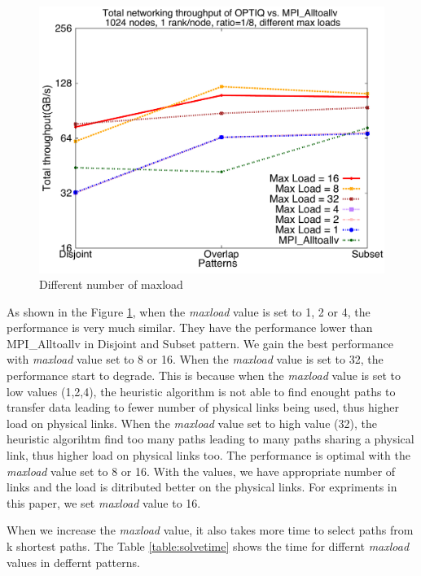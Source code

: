 \begin{figure}[!htb]
\vspace{-0.1in}
\centering
\includegraphics[scale=0.30]{figures/heu_paths_3p.pdf}
\vspace{-0.1in}
\caption{Different number of maxload}
\vspace{-0.1in}
\label{fig:heu_paths_3p}
\end{figure}

As shown in the Figure \ref{fig:heu_paths_3p}, when the \textit{maxload} value is set to 1, 2 or 4, the performance is very much similar. They have the performance lower than MPI\_Alltoallv in Disjoint and Subset pattern. We gain the best performance with \textit{maxload} value set to 8 or 16. When the \textit{maxload} value is set to 32, the performance start to degrade. This is because when the \textit{maxload} value is set to low values (1,2,4), the heuristic algorithm is not able to find enought paths to transfer data leading to fewer number of physical links being used, thus higher load on physical links. When the \textit{maxload} value set to high value (32), the heuristic algorihtm find too many paths leading to many paths sharing a physical link, thus higher load on physical links too. The performance is optimal with the \textit{maxload} value set to 8 or 16. With the values, we have appropriate number of links and the load is ditributed better on the physical links. For expriments in this paper, we set \textit{maxload} value to 16.

When we increase the \textit{maxload} value, it also takes more time to select paths from k shortest paths. The Table \ref{table:solvetime} shows the time for differnt \textit{maxload} values in deffernt patterns. 

